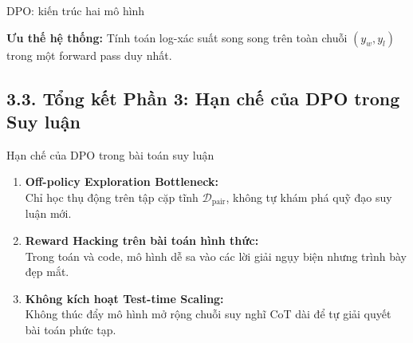 \begin{frame}{DPO: kiến trúc hai mô hình}
\begin{center}
{%
    }
  \end{center}
  \vspace{0.05cm}
  \small
  \textbf{Ưu thế hệ thống:} Tính toán log-xác suất song song trên toàn chuỗi $(y_w, y_l)$ trong một forward pass duy nhất.
  \par\vspace{0pt}
\end{frame}

\subsection{3.3. Tổng kết Phần 3: Hạn chế của DPO trong Suy luận}

\begin{frame}{Hạn chế của DPO trong bài toán suy luận}
  \begin{enumerate}\setlength{\itemsep}{4pt}
    \item \textbf{Off-policy Exploration Bottleneck:}\\
      \small Chỉ học thụ động trên tập cặp tĩnh $\mathcal{D}_{\text{pair}}$, không tự khám phá quỹ đạo suy luận mới.
    \item \textbf{Reward Hacking trên bài toán hình thức:}\\
      \small Trong toán và code, mô hình dễ sa vào các lời giải ngụy biện nhưng trình bày đẹp mắt.
    \item \textbf{Không kích hoạt Test-time Scaling:}\\
      \small Không thúc đẩy mô hình mở rộng chuỗi suy nghĩ CoT dài để tự giải quyết bài toán phức tạp.
  \end{enumerate}
  \par\vspace{0pt}
\end{frame}
